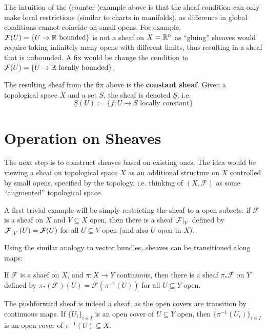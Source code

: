 \documentclass{article}
\begin{document}
\nogap
\begin{remark}
    The intuition of the (counter-)example above is that the sheaf condition can only make local restrictions (similar to charts in manifolds), as difference in global conditions cannot coincide on small opens. For example, $\mathcal{F}(U) = \{ U \to \mathbb{R} \text{ bounded} \}$ is not a sheaf on $X = \mathbb{R}^n$ as ``gluing'' sheaves would require taking infinitely many opens with different limits, thus resulting in a sheaf that is unbounded. A fix would be change the condition to $\mathcal{F}(U) = \{ U \to \mathbb{R} \text{ locally bounded} \}$.
\end{remark}

\begin{definition}
    The resulting sheaf from the fix above is the \textbf{constant sheaf}. Given a topological space $X$ and a set $S$, the sheaf is denoted $\underline{S}$, i.e.
    \[
        \underline{S}(U) := \{ f: U \to S \text{ locally constant} \}
    \]
\end{definition}

\section{Operation on Sheaves}

\textstart
The next step is to construct sheaves based on existing ones. The idea would be viewing a sheaf on topological space $X$ as an additional structure on $X$ controlled by small opens, specified by the topology, i.e. thinking of $(X, \mathcal{F})$ as some ``augmented'' topological space.

A first trivial example will be simply restricting the sheaf to a open subsets: if $\mathcal{F}$ is a sheaf on $X$ and $V \subseteq X$ open, then there is a sheaf $\left.\mathcal{F}\right|_{V}$ defined by $\left.\mathcal{F}\right|_{V}(U) = \mathcal{F}(U)$ for all $U \subseteq V$ open (and also $U$ open in $X$).

Using the similar analogy to vector bundles, sheaves can be transitioned along maps:

\begin{definition}\label{def: pushforward sheaf}
    If $\mathcal{F}$ is a shaef on $X$, and $\pi: X \to Y$ continuous, then there is a sheaf $\pi_{\ast}\mathcal{F}$ on $Y$ defined by $\pi_{\ast}(\mathcal{F})(U) = \mathcal{F}(\pi^{-1}(U))$ for all $U \subseteq Y$ open.
\end{definition}
\nogap
\begin{remark}
    The pushforward sheaf is indeed a sheaf, as the open covers are transition by continuous maps. If $\{ U_i \}_{i \in I}$ is an open cover of $U \subseteq Y$ open, then $\{ \pi^{-1}(U_i) \}_{i \in I}$ is an open cover of $\pi^{-1}(U) \subseteq X$.
\end{remark}
\end{document}
